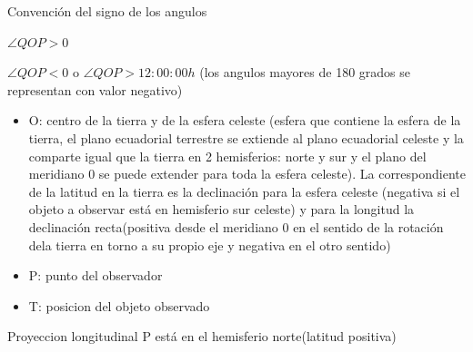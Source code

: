 \documentclass{article}
\begin{document}
Convención del signo de los angulos

$\angle{QOP} > 0$

$\angle{QOP} < 0$  o $\angle{QOP} > 12:00:00h $ (los angulos mayores de 180 grados se representan con valor negativo)



\begin{itemize}
\item O: centro de la tierra y de la esfera celeste (esfera que contiene la esfera de la tierra, el plano ecuadorial terrestre se extiende al plano ecuadorial celeste y la comparte igual que la tierra en 2 hemisferios: norte y sur y el plano del meridiano 0 se puede extender para toda la esfera celeste). La correspondiente de la latitud en la tierra es la declinación para la esfera celeste (negativa si el objeto a observar está en hemisferio sur celeste) y para la longitud la declinación recta(positiva desde el meridiano 0 en el sentido de la rotación dela tierra en torno a su propio eje y negativa en el otro sentido)
\item P: punto del observador
\item T: posicion del objeto observado
\end{itemize}

Proyeccion longitudinal
P está en el hemisferio norte(latitud positiva) 
\vspace{5cm}
\end{document}
